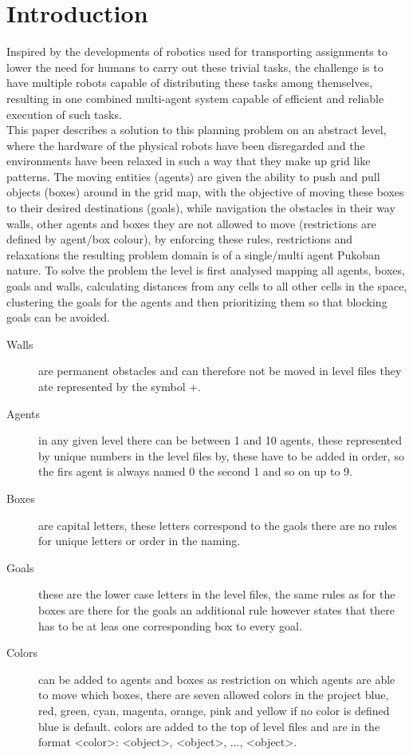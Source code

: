 \documentclass[letterpaper]{article}
\begin{document}
\section{Introduction}
	Inspired by the developments of robotics used for transporting assignments to lower the need for humans to carry out these trivial tasks, the challenge is to have multiple robots capable of distributing these tasks among themselves, resulting in one combined multi-agent system capable of efficient and reliable execution of such tasks.\\
	This paper describes a solution to this planning problem on an abstract level, where the hardware of the physical robots have been disregarded and the environments have been relaxed in such a way that they make up grid like patterns. The  moving entities (agents) are given the ability to push and pull objects (boxes) around in the grid map, with the objective of moving these boxes to their desired destinations (goals), while navigation the obstacles in their way walls, other agents and boxes they are not allowed to move (restrictions are defined by agent/box colour), by enforcing these rules, restrictions and relaxations the resulting problem domain is of a single/multi agent Pukoban nature. 
		To solve the problem the level is first analysed mapping all agents, boxes, goals and walls, calculating distances from any cells to all other cells in the space, clustering the goals for the agents and then prioritizing them so that blocking goals can be avoided.\\
		\begin{description}
			\item[Walls] are permanent obstacles and can therefore not be moved in level files they ate represented by the symbol +.
			\item[Agents] in any given level there can be between 1 and 10 agents, these represented by unique numbers in the level files by, these have to be added in order, so the firs agent is always named 0 the second 1 and so on up to 9.
			\item[Boxes] are capital letters, these letters correspond to the gaols there are no rules for unique letters or order in the naming.
			\item[Goals] these are the lower case letters in the level files, the same rules as for the boxes are there for the goals an additional rule however states that there has to be at leas one corresponding box to every goal.
			\item[Colors]can be added to agents and boxes as restriction on which agents are able to move which boxes, there are seven allowed colors in the project blue, red, green, cyan, magenta, orange, pink and yellow if no color is defined blue is default. colors are added to the top of level files and are in the format <color>: <object>, <object>, ..., <object>.
		\end{description}
\end{document}
